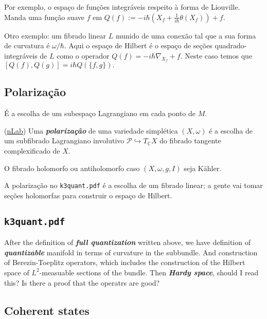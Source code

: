 Por exemplo, o espaço de funções integráveis respeito à forma de Liouville. Manda uma função suave $f$ em $Q(f):=-i\hbar \left( X_f+\frac{1}{i\hbar}\theta(X_f) \right) +f$.

Otro exemplo: um fibrado linear $L$ munido de uma conexão tal que a sua forma de curvatura é $ \omega /\hbar$. Aqui o espaço de Hilbert é o espaço de seções quadrado-integráveis de $L$ como o operador $Q(f)=-i\hbar \nabla_{X_f}+f$. Neste caso temos que $[Q(f),Q(g)]=i\hbar Q(\{f,g\}).$

\subsection{Polarização}

É a escolha de um subespaço Lagrangiano em cada ponto de $M$.

\begin{defn}(\href{https://ncatlab.org/nlab/show/polarization#OfASymplecticManifold}{nLab})
	Uma \textit{\textbf{polarização}} de uma variedade simplética $(X,\omega )$ é a escolha de um subfibrado Lagrangiano involutivo $\mathcal{P}\hookrightarrow T_{\mathbb{C}}X$ do fibrado tangente complexificado de $X$.
\end{defn}

\begin{example}
	O fibrado holomorfo ou antiholomorfo caso $(X,\omega,g,I)$ seja K\"ahler.
\end{example}

A polarização no  \texttt{k3quant.pdf} é a escolha de um fibrado linear; a gente vai tomar seções holomorfas para construir o espaço de Hilbert.

\subsection{\texttt{k3quant.pdf}}

After the definition of \textit{\textbf{full quantization}} written above, we have definition of \textit{\textbf{quantizable}} manifold in terms of curvature in the subbundle. And construction of Berezin-Toeplitz operators, which includes the construction of the Hilbert space of $L^2$-measuable sections of the bundle. Then \textit{\textbf{Hardy space}}, should I read this? Is there a proof that the operatrs are good?

\subsection{Coherent states}

